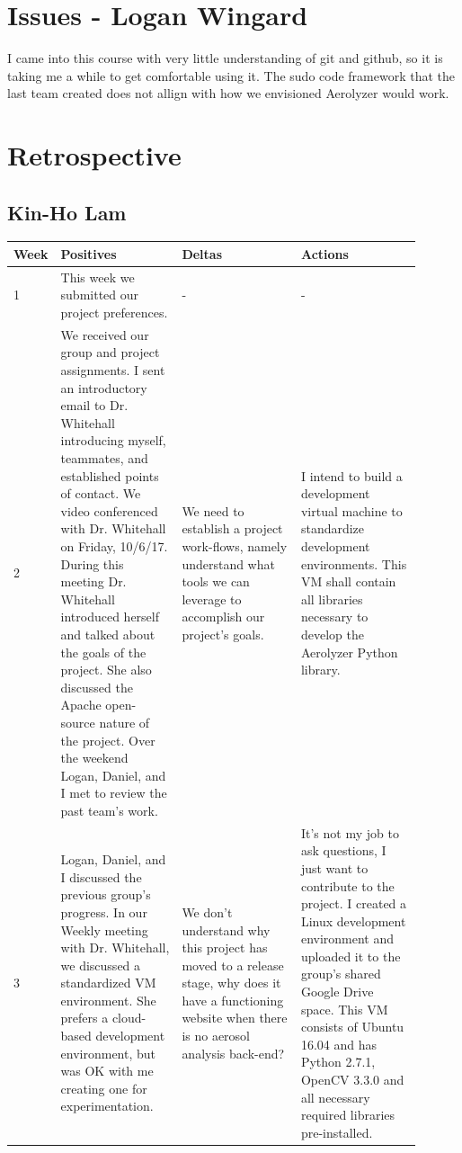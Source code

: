 \documentclass[onecolumn, draftclsnofoot,10pt, compsoc]{IEEEtran}
\begin{document}
\begin{singlespace}
	\section{Issues - Logan Wingard}
		I came into this course with very little understanding of git and github, so it is taking me a while to get comfortable using it.
		The sudo code framework that the last team created does not allign with how we envisioned Aerolyzer would work.

	\section{Retrospective}
		\subsection{Kin-Ho Lam}
		\begin{longtable}{|l|p{0.3\linewidth}|p{0.3\linewidth}|p{0.3\linewidth}|}\hline \textbf{Week} & \textbf{Positives} & \textbf{Deltas} & \textbf{Actions}\\\hline
		1 	& This week we submitted our project preferences. & - & -\\\hline

		2 	&
			We received our group and project assignments. I sent an introductory email to Dr. Whitehall introducing myself, teammates, and established points of contact.
			We video conferenced with Dr. Whitehall on Friday, 10/6/17.
			During this meeting Dr. Whitehall introduced herself and talked about the goals of the project.
			She also discussed the Apache open-source nature of the project.
			Over the weekend Logan, Daniel, and I met to review the past team's work.
			&
			We need to establish a project work-flows, namely understand what tools we can leverage to accomplish our project's goals. 
			&
			I intend to build a development virtual machine to standardize development environments.
			This VM shall contain all libraries necessary to develop the Aerolyzer Python library.
			\\\hline

		3	&
			Logan, Daniel, and I discussed the previous group's progress.
			In our Weekly meeting with Dr. Whitehall, we discussed a standardized VM environment.
			She prefers a cloud-based development environment, but was OK with me creating one for experimentation.
			&
			We don't understand why this project has moved to a release stage, why does it have a functioning website when there is no aerosol analysis back-end?
			&
			It's not my job to ask questions, I just want to contribute to the project.
			I created a Linux development environment and uploaded it to the group's shared Google Drive space.
			This VM consists of Ubuntu 16.04 and has Python 2.7.1, OpenCV 3.3.0 and all necessary required libraries pre-installed.
			\\\hline


\end{longtable}
\end{singlespace}
\end{document}
